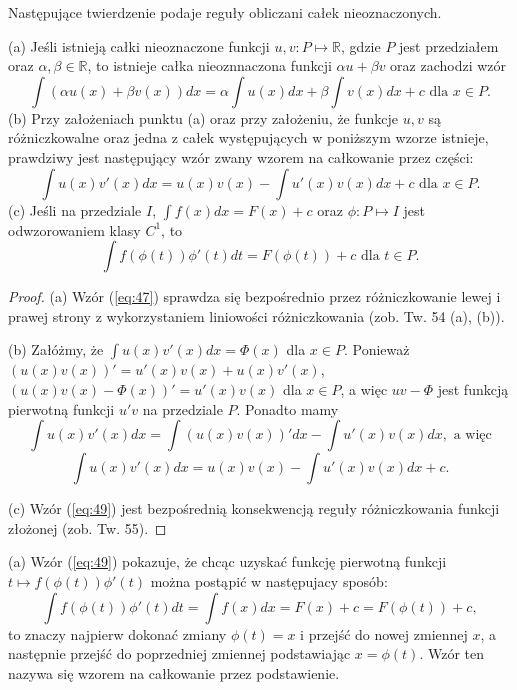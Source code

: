 \documentclass[leqno]{article}
\begin{document}
\begin{justify}
Następujące twierdzenie podaje reguły obliczani całek nieoznaczonych.

\begin{theorem}
{   (a) Jeśli istnieją całki nieoznaczone funkcji $u, v : P \mapsto \mathbb{R}$, gdzie $P$ jest przedziałem
    oraz $\alpha, \beta \in \mathbb{R}$, to istnieje całka nieoznnaczona funkcji
    $\alpha u + \beta v$ oraz zachodzi wzór
    \begin{equation}\label{eq:47}
        \int (\alpha u(x) + \beta v(x))dx = \alpha \int u(x)dx + \beta \int v(x)dx + c \text{ dla } x \in P.
    \end{equation}
    (b) Przy założeniach punktu (a) oraz przy założeniu, że funkcje $u, v$ są różniczkowalne oraz jedna z całek występujących
    w poniższym wzorze istnieje, prawdziwy jest następujący wzór zwany wzorem na całkowanie przez części:
    \begin{equation}\label{eq:48}
        \int u(x)v'(x)dx = u(x)v(x) - \int u'(x)v(x)dx + c \text{ dla } x \in P.
    \end{equation}
    (c) Jeśli na przedziale $I$, $\int f(x)dx = F(x) + c$ oraz $\phi : P \mapsto I$ jest odwzorowaniem klasy $C^1$, to
    \begin{equation}\label{eq:49}
        \int f(\phi(t))\phi'(t)dt = F(\phi(t)) + c \text{ dla } t \in P.
    \end{equation}
}
\end{theorem}

\begin{proof}
    (a) Wzór (\ref{eq:47}) sprawdza się bezpośrednio przez różniczkowanie lewej i prawej strony z wykorzystaniem liniowości różniczkowania (zob. Tw. 54 (a), (b)).
    
    \noindent
    (b) Załóżmy, że $\int u(x)v'(x)dx = \Phi(x)$ dla $x \in P$. Ponieważ $(u(x)v(x))'=u'(x)v(x) + u(x)v'(x)$,
    $(u(x)v(x)-\Phi(x))' = u'(x)v(x)$ dla $x \in P$, a więc $uv - \Phi$ jest funkcją pierwotną funkcji $u'v$ na przedziale $P$.
    Ponadto mamy
    \[
        \int u(x)v'(x)dx = \int (u(x)v(x))'dx - \int u'(x)v(x)dx, \text{ a więc}
    \]
    \[
        \int u(x)v'(x)dx = u(x)v(x) - \int u'(x)v(x)dx + c.
    \]

    \noindent
    (c) Wzór (\ref{eq:49}) jest bezpośrednią konsekwencją reguły różniczkowania funkcji złożonej
    (zob. Tw. 55).

\end{proof}

\begin{uwaga}
    (a) Wzór (\ref{eq:49}) pokazuje, że chcąc uzyskać funkcję pierwotną funkcji $t \mapsto f(\phi(t))\phi'(t)$ można postąpić w następujacy sposób:
    \[
        \int f(\phi(t))\phi'(t)dt = \int f(x)dx = F(x) + c = F(\phi(t)) + c,
    \]
    to znaczy najpierw dokonać zmiany $\phi(t) = x$ i przejść do nowej zmiennej $x$, a następnie
    przejść do poprzedniej zmiennej podstawiając $x = \phi(t)$. Wzór ten nazywa się
    wzorem na całkowanie przez podstawienie.


\end{uwaga}
\end{justify}
\end{document}
